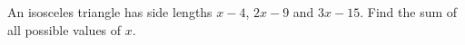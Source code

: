 An isosceles triangle has side lengths $x-4$, $2x-9$ and $3x-15$. Find the sum of all possible values of $x$.
